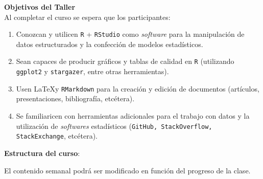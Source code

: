 \documentclass[11pt]{article}
\begin{document}
\textbf {\large Objetivos del Taller} \\

Al completar el curso se espera que los participantes:
\begin{enumerate} \itemsep0.75em

  \item Conozcan y utilicen \verb=R= + \verb=RStudio= como \textit{software} para la manipulación de datos estructurados y la confección de modelos estadísticos.
  \item Sean capaces de producir gráficos y tablas de calidad en \verb=R= (utilizando \verb=ggplot2= y \verb=stargazer=, entre otras herramientas). 
  \item Usen \LaTeX y \verb=RMarkdown= para la creación y edición de documentos (artículos, presentaciones, bibliografía, etcétera).

  \item  Se familiaricen con herramientas adicionales para el trabajo con datos y la utilización de \textit{softwares} estadísticos (\verb=GitHub, StackOverflow, StackExchange=, etcétera). 
\end{enumerate}
\clearpage

\textbf {\large Estructura del curso}:


\vspace{.5cm}
El contenido semanal podrá ser modificado en función del progreso de la clase. 

\vspace{.5cm}
\end{document}
